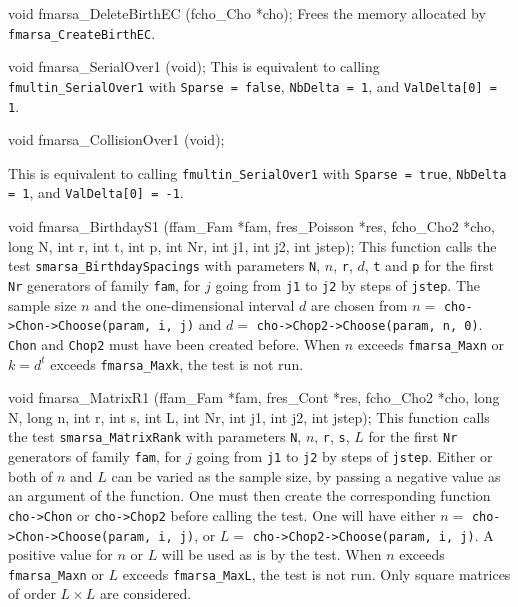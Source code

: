 void fmarsa_DeleteBirthEC (fcho_Cho *cho);
\endcode
 \tab
  Frees the memory allocated by {\tt fmarsa\_CreateBirthEC}.
 \endtab




\code

void fmarsa_SerialOver1 (void);
\endcode
\tab  This is equivalent to calling {\tt fmultin\_SerialOver1} with
  {\tt Sparse = false}, {\tt NbDelta = 1}, and {\tt Val\-Delta[0] = 1}.
\endtab
\code


void fmarsa_CollisionOver1 (void);
\endcode

\tab This is equivalent to calling {\tt fmultin\_SerialOver1} with
  {\tt Sparse = true}, {\tt NbDelta = 1}, and {\tt Val\-Delta[0] = -1}.
\endtab
\code


void fmarsa_BirthdayS1 (ffam_Fam *fam, fres_Poisson *res, fcho_Cho2 *cho,
                        long N, int r, int t, int p,
                        int Nr, int j1, int j2, int jstep);
\endcode
\tab  This function calls the test {\tt smarsa\_BirthdaySpacings} with
  parameters {\tt N}, $n$,  {\tt r}, $d$, {\tt t} and  {\tt p} for the
  first {\tt Nr} generators of family {\tt fam}, for $j$ going from
  {\tt j1} to {\tt j2} by steps of {\tt jstep}. The sample  size $n$ and
  the one-dimensional interval $d$ are chosen from
  $n = {}$ {\tt cho->Chon->Choose(param, i, j)} and
  $d = {}$ {\tt cho->Chop2->Choose(param, n, 0)}. {\tt Chon} and
  {\tt Chop2} must have been created before. When $n$ exceeds
  {\tt fmarsa\_Maxn} or $k = d^t$ exceeds {\tt fmarsa\_Maxk},
  the test is not run.
\endtab
\code


void fmarsa_MatrixR1 (ffam_Fam *fam, fres_Cont *res, fcho_Cho2 *cho,
                      long N, long n, int r, int s, int L,
                      int Nr, int j1, int j2, int jstep);
\endcode
  \tab  This function calls the test {\tt smarsa\_MatrixRank} with
  parameters {\tt N}, $n$,  {\tt r},  {\tt s}, $L$ for the first {\tt Nr}
  generators of family {\tt fam}, for $j$ going from {\tt j1} to {\tt j2}
  by steps of {\tt jstep}. Either or both of $n$ and $L$ can be varied as
  the sample size, by passing a negative value as an argument of the
  function. One must then create the corresponding function
  {\tt cho->Chon} or {\tt cho->Chop2} before calling the test.
  One will have either $n = {}$ {\tt cho->Chon->Choose(param, i, j)},
  or $L = {}$ {\tt cho->Chop2->Choose(param, i, j)}. A positive value for
  $n$ or $L$ will be used as is by the test. When $n$ exceeds
 {\tt fmarsa\_Maxn} or  $L$ exceeds {\tt fmarsa\_MaxL}, the test is not
 run. Only square matrices of order $L\times L$ are considered.
 \endtab
\code


